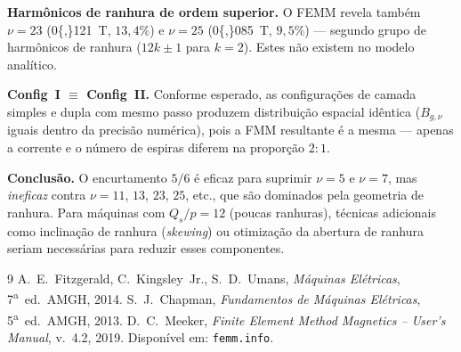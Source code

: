 \documentclass[12pt,a4paper]{article}
\begin{document}
\textbf{Harmônicos de ranhura de ordem superior.}
O FEMM revela também $\nu{=}23$ (\SI{0{,}121}{T}, $13{,}4\%$) e $\nu{=}25$
(\SI{0{,}085}{T}, $9{,}5\%$) --- segundo grupo de harmônicos de ranhura
($12k{\pm}1$ para $k{=}2$).  Estes não existem no modelo analítico.

\textbf{Config~I $\equiv$ Config~II.}
Conforme esperado, as configurações de camada simples e dupla com mesmo passo
produzem distribuição espacial idêntica ($B_{g,\nu}$ iguais dentro da precisão
numérica), pois a FMM resultante é a mesma --- apenas a corrente e o número de
espiras diferem na proporção $2{:}1$.

\textbf{Conclusão.}
O encurtamento $5/6$ é eficaz para suprimir $\nu{=}5$ e $\nu{=}7$, mas
\emph{ineficaz} contra $\nu{=}11$, $13$, $23$, $25$, etc., que são dominados
pela geometria de ranhura.  Para máquinas com $Q_s/p{=}12$ (poucas ranhuras),
técnicas adicionais como inclinação de ranhura (\textit{skewing}) ou
otimização da abertura de ranhura seriam necessárias para reduzir esses
componentes.

\begin{thebibliography}{9}\small\vspace{-2pt}
  A.~E.~Fitzgerald, C.~Kingsley~Jr., S.~D.~Umans,
  \textit{Máquinas Elétricas}, 7\textsuperscript{a}~ed.\ AMGH, 2014.
  S.~J.~Chapman, \textit{Fundamentos de Máquinas Elétricas},
  5\textsuperscript{a}~ed.\ AMGH, 2013.
  D.~C.~Meeker,
  \textit{Finite Element Method Magnetics -- User's Manual}, v.~4.2, 2019.
  Disponível em: \texttt{femm.info}.
\end{thebibliography}
\end{document}

